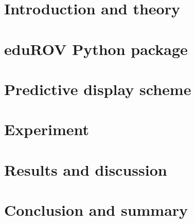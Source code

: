 \documentclass[b5paper,10pt,twoside,openright]{book}
\begin{document}
\newpage\null\thispagestyle{empty}\newpage

\begingroup
\let\cleardoublepage\clearpage






\endgroup
 
{
\tableofcontents

{}
\listoffigures
\cleardoublepage

{}
\listoftables
\cleardoublepage
}
{

\chapter{Introduction and theory} \label{chpIntroduction}
		
	
\chapter{eduROV Python package}\label{chpEdurov}
		
	
\chapter{Predictive display scheme}\label{chpPredictive}
		

\chapter{Experiment}\label{chpMethod}
		

\chapter{Results and discussion}\label{chpResults}
	

\chapter{Conclusion and summary}\label{chpConc}
	

{
}
\printbibliography
{}

\begin{appendices}\label{appendix}


\end{appendices}}
\end{document}
